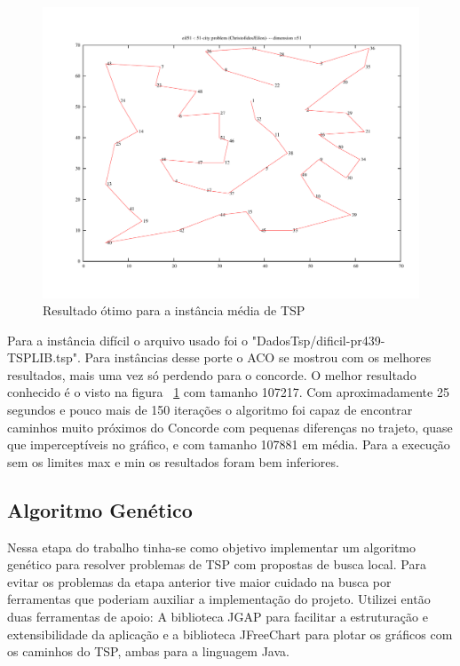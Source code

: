 \documentclass{acm_proc_article-sp}
\begin{document}
\begin{figure}[ht]
 \begin{center}
  \includegraphics[scale=0.3]{imagens/medio_concorde.pdf} 
  \caption{Resultado ótimo para a instância média de TSP}
  \label{fig:medio-concorde}
 \end{center}
\end{figure}

Para a instância difícil o arquivo usado foi o "DadosTsp/dificil-pr439-TSPLIB.tsp". Para instâncias desse porte o ACO se mostrou com os melhores resultados, mais uma vez só perdendo para o concorde. O melhor resultado conhecido é o visto na figura ~\ref{fig:medio-concorde} com tamanho 107217. Com aproximadamente 25 segundos e pouco mais de 150 iterações o algoritmo foi capaz de encontrar caminhos muito próximos do Concorde com pequenas diferenças no trajeto, quase que imperceptíveis no gráfico, e com tamanho 107881 em média. Para a execução sem os limites max e min os resultados foram bem inferiores.


\subsection{Algoritmo Genético}
Nessa etapa do trabalho tinha-se como objetivo implementar um algoritmo genético para resolver problemas de TSP com propostas de busca local. Para evitar os problemas da etapa anterior tive maior cuidado na busca por ferramentas que poderiam auxiliar a implementação do projeto. Utilizei então duas ferramentas de apoio: A biblioteca JGAP \cite{JGAP} para facilitar a estruturação e extensibilidade da aplicação e a biblioteca JFreeChart\cite{JFreeChart} para plotar os gráficos com os caminhos do TSP, ambas para a linguagem Java.
\end{document}
